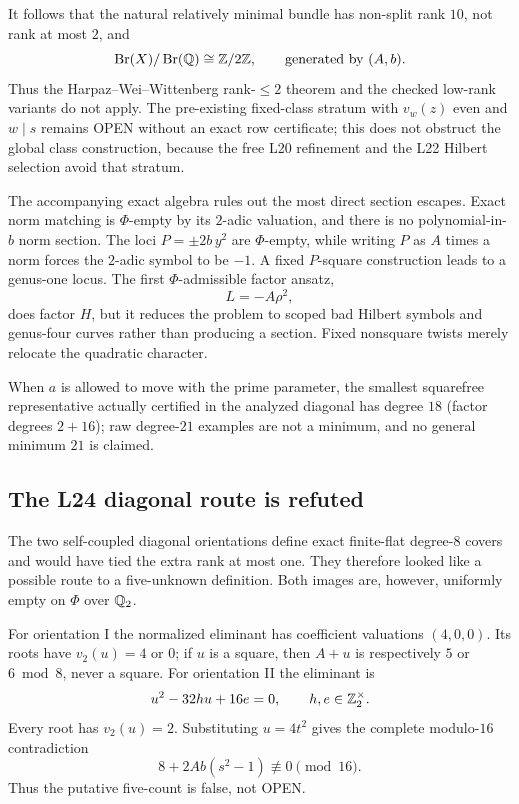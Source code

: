 It follows that the natural relatively minimal bundle has non-split rank
\(10\), not rank at most \(2\), and
\[
 \operatorname{Br}(X)/\operatorname{Br}(\mathbb{Q})
   \cong\mathbb{Z}/2\mathbb{Z},\qquad\text{generated by }(A,b).
\]
Thus the Harpaz--Wei--Wittenberg rank-\(\le2\) theorem and the checked
low-rank variants do not apply.  The pre-existing fixed-class stratum
with \(v_w(z)\) even and \(w\mid s\) remains OPEN without an exact row
certificate; this does not obstruct the global class construction,
because the free L20 refinement and the L22 Hilbert selection avoid that
stratum.

The accompanying exact algebra rules out the most direct section
escapes.  Exact norm matching is \(\Phi\)-empty by its \(2\)-adic
valuation, and there is no polynomial-in-\(b\) norm section.  The loci
\(P=\pm2b\,y^2\) are \(\Phi\)-empty, while writing \(P\) as \(A\) times
a norm forces the \(2\)-adic symbol to be \(-1\).  A fixed
\(P\)-square construction leads to a genus-one locus.  The first
\(\Phi\)-admissible factor ansatz,
\[
 L=-A\rho^2,
\]
does factor \(H\), but it reduces the problem to scoped bad Hilbert
symbols and genus-four curves rather than producing a section.  Fixed
nonsquare twists merely relocate the quadratic character.

When \(a\) is allowed to move with the prime parameter, the smallest
squarefree representative actually certified in the analyzed diagonal
has degree \(18\) (factor degrees \(2+16\)); raw degree-\(21\) examples
are not a minimum, and no general minimum \(21\) is claimed.

\subsection{The L24 diagonal route is refuted}

The two self-coupled diagonal orientations define exact finite-flat
degree-\(8\) covers and would have tied the extra rank at most one.  They
therefore looked like a possible route to a five-unknown definition.
Both images are, however, uniformly empty on \(\Phi\) over \(\mathbb{Q}_2\).

For orientation I the normalized eliminant has coefficient valuations
\((4,0,0)\).  Its roots have \(v_2(u)=4\) or \(0\); if \(u\) is a square,
then \(A+u\) is respectively \(5\) or \(6\bmod8\), never a square.  For
orientation II the eliminant is
\[
 u^2-32hu+16e=0,\qquad h,e\in\mathbb{Z}_2^\times .
\]
Every root has \(v_2(u)=2\).  Substituting \(u=4t^2\) gives the complete
modulo-\(16\) contradiction
\[
 8+2Ab(s^2-1)\not\equiv0\pmod{16}.
\]
Thus the putative five-count is false, not OPEN.

